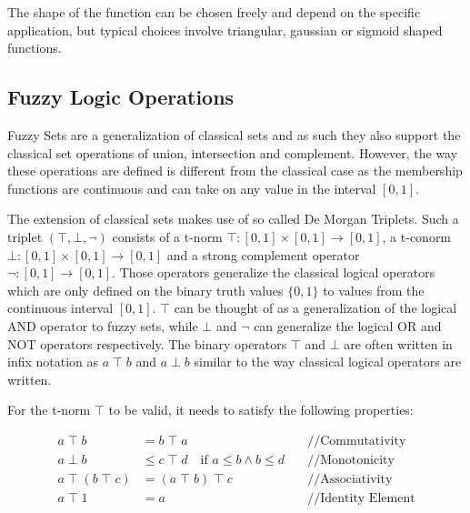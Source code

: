 The shape of the function can be chosen freely and depend on the specific application, but typical choices involve triangular, gaussian or sigmoid shaped functions.



\subsection{Fuzzy Logic Operations}

Fuzzy Sets are a generalization of classical sets and as such they also support the classical set operations of union, intersection and complement. However, the way these operations are defined is different from the classical case as the membership functions are continuous and can take on any value in the interval $[0, 1]$.

The extension of classical sets makes use of so called De Morgan Triplets. Such a triplet $(\top, \bot, \neg)$ consists of a t-norm $\top : [0, 1] \times [0, 1] \rightarrow [0, 1]$, a t-conorm $\bot : [0, 1] \times [0, 1] \rightarrow [0, 1]$ and a strong complement operator $\neg : [0, 1] \rightarrow [0, 1]$. Those operators generalize the classical logical operators which are only defined on the binary truth values $\{0, 1\}$ to values from the continuous interval $[0, 1]$. $\top$ can be thought of as a generalization of the logical AND operator to fuzzy sets, while $\bot$  and $\neg$ can generalize the logical OR and NOT operators respectively. The binary operators $\top$ and $\bot$ are often written in infix notation as $a \; \top \; b$ and $a \; \bot \; b$ similar to the way classical logical operators are written.


For the t-norm $\top$ to be valid, it needs to satisfy the following properties:

\begin{align*}
      a \; \top \; b                & = b \; \top \; a                                              & \quad \text{//Commutativity}    \\
      a \; \bot \; b                & \leq c \; \top \; d  \quad \text{if }  a\leq b \land b \leq d & \quad \text{//Monotonicity}     \\
      a \; \top \; (b \; \top \; c) & = (a \; \top \; b) \; \top \; c                               & \quad \text{//Associativity}    \\
      a \; \top \; 1                & = a                                                           & \quad \text{//Identity Element}
\end{align*}

